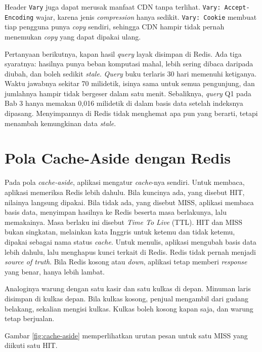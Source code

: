 Header \texttt{Vary} juga dapat merusak manfaat CDN tanpa terlihat.
\texttt{Vary: Accept-Encoding} wajar, karena jenis \textit{compression} hanya sedikit.
\texttt{Vary: Cookie} membuat tiap pengguna punya \textit{copy} sendiri, sehingga CDN
hampir tidak pernah menemukan \textit{copy} yang dapat dipakai ulang.

Pertanyaan berikutnya, kapan hasil \textit{query} layak disimpan di Redis. Ada tiga
syaratnya: hasilnya punya beban komputasi mahal, lebih sering dibaca
daripada diubah,
dan boleh sedikit \textit{stale}. \textit{Query} buku terlaris 30 hari memenuhi ketiganya. Waktu
jawabnya sekitar 70 milidetik, isinya sama untuk semua pengunjung, dan
jumlahnya hampir tidak bergeser dalam satu menit. Sebaliknya, \textit{query} Q1 pada
Bab 3 hanya memakan 0,016 milidetik di dalam basis data setelah indeksnya
dipasang. Menyimpannya di Redis tidak menghemat apa pun yang berarti, tetapi
menambah kemungkinan data \textit{stale}.

\section{Pola Cache-Aside dengan Redis}
\label{sec:cache-aside}

Pada pola \textit{cache-aside}, aplikasi mengatur \textit{cache}-nya sendiri.
Untuk membaca, aplikasi memeriksa Redis lebih dahulu. Bila kuncinya ada, yang
disebut HIT, nilainya langsung dipakai. Bila tidak ada, yang disebut MISS,
aplikasi membaca basis data, menyimpan hasilnya ke Redis beserta masa
berlakunya, lalu memakainya. Masa berlaku ini disebut \textit{Time To Live}
(TTL). HIT dan MISS bukan singkatan, melainkan kata Inggris untuk ketemu dan
tidak ketemu, dipakai sebagai nama status \textit{cache}. Untuk menulis, aplikasi mengubah basis data lebih dahulu, lalu menghapus
kunci terkait di Redis. Redis tidak pernah menjadi \textit{source of truth}. Bila Redis
kosong atau \textit{down}, aplikasi tetap memberi \textit{response} yang benar, hanya lebih
lambat.

Analoginya warung dengan satu kasir dan satu kulkas di depan. Minuman laris
disimpan di kulkas depan. Bila kulkas kosong, penjual mengambil dari gudang
belakang, sekalian mengisi kulkas. Kulkas boleh kosong kapan saja, dan warung
tetap berjualan.

Gambar \ref{fig:cache-aside} memperlihatkan urutan pesan untuk satu MISS yang
diikuti satu HIT.

